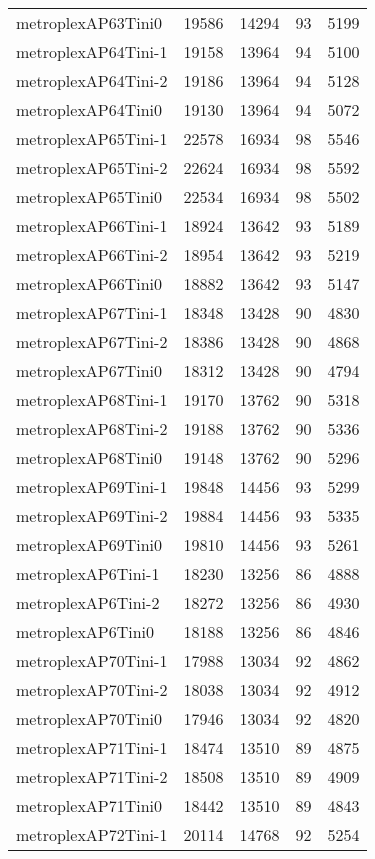 \begin{longtable}{lrrrr}
metroplexAP63Tini0 & 19586 & 14294 & 93 & 5199 \\
metroplexAP64Tini-1 & 19158 & 13964 & 94 & 5100 \\
metroplexAP64Tini-2 & 19186 & 13964 & 94 & 5128 \\
metroplexAP64Tini0 & 19130 & 13964 & 94 & 5072 \\
metroplexAP65Tini-1 & 22578 & 16934 & 98 & 5546 \\
metroplexAP65Tini-2 & 22624 & 16934 & 98 & 5592 \\
metroplexAP65Tini0 & 22534 & 16934 & 98 & 5502 \\
metroplexAP66Tini-1 & 18924 & 13642 & 93 & 5189 \\
metroplexAP66Tini-2 & 18954 & 13642 & 93 & 5219 \\
metroplexAP66Tini0 & 18882 & 13642 & 93 & 5147 \\
metroplexAP67Tini-1 & 18348 & 13428 & 90 & 4830 \\
metroplexAP67Tini-2 & 18386 & 13428 & 90 & 4868 \\
metroplexAP67Tini0 & 18312 & 13428 & 90 & 4794 \\
metroplexAP68Tini-1 & 19170 & 13762 & 90 & 5318 \\
metroplexAP68Tini-2 & 19188 & 13762 & 90 & 5336 \\
metroplexAP68Tini0 & 19148 & 13762 & 90 & 5296 \\
metroplexAP69Tini-1 & 19848 & 14456 & 93 & 5299 \\
metroplexAP69Tini-2 & 19884 & 14456 & 93 & 5335 \\
metroplexAP69Tini0 & 19810 & 14456 & 93 & 5261 \\
metroplexAP6Tini-1 & 18230 & 13256 & 86 & 4888 \\
metroplexAP6Tini-2 & 18272 & 13256 & 86 & 4930 \\
metroplexAP6Tini0 & 18188 & 13256 & 86 & 4846 \\
metroplexAP70Tini-1 & 17988 & 13034 & 92 & 4862 \\
metroplexAP70Tini-2 & 18038 & 13034 & 92 & 4912 \\
metroplexAP70Tini0 & 17946 & 13034 & 92 & 4820 \\
metroplexAP71Tini-1 & 18474 & 13510 & 89 & 4875 \\
metroplexAP71Tini-2 & 18508 & 13510 & 89 & 4909 \\
metroplexAP71Tini0 & 18442 & 13510 & 89 & 4843 \\
metroplexAP72Tini-1 & 20114 & 14768 & 92 & 5254 \\

\end{longtable}
